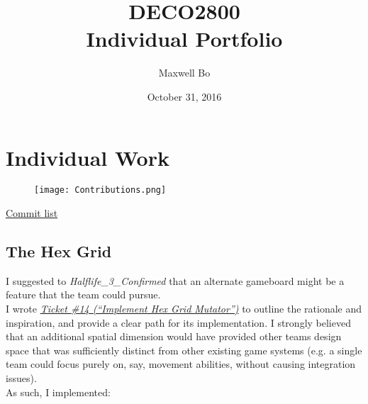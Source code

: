 \documentclass[11pt,a4paper]{report}
\begin{document}
\title{DECO2800 \\ Individual Portfolio}
\author{Maxwell Bo}
\date{October 31, 2016}
\maketitle

\chapter{Individual Work}

 \begin{figure}[h!]
    \centering
    \texttt{[image: Contributions.png]}
 \end{figure}

\href{https://github.com/UQdeco2800/deco2800-2016-pyramidscheme/commits?author=MaxwellBo}{Commit list}

\section{The Hex Grid}

I suggested to \textit{Halflife\_3\_Confirmed} that an alternate gameboard might be a feature that the team could pursue.\\ 

I wrote \href{https://github.com/UQdeco2800/deco2800-2016-pyramidscheme/issues/14}{\textit{Ticket \#14 (``Implement Hex Grid Mutator'')}} to outline the rationale and inspiration, and provide a clear path for its implementation. I strongly believed that an additional spatial dimension would have provided other teams design space that was sufficiently distinct from other existing game systems (e.g. a single team could focus purely on, say, movement abilities, without causing integration issues).\\

As such, I implemented:
\end{document}
